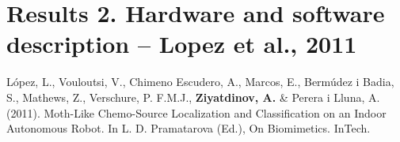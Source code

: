 
\thispagestyle{empty}

\begingroup
\let\clearpage\relax
\let\cleardoublepage\relax
\let\cleardoublepage\relax

\vspace*{3cm}

  {
    \section{Results 2. Hardware and software description  -- Lopez et al., 2011}\label{pub2}
  }

\medskip

\noindent L\'{o}pez, L., Vouloutsi, V., Chimeno Escudero, A., Marcos, E., Berm\'{u}dez i Badia, S., Mathews, Z., 
Verschure, P. F.M.J., \textbf{Ziyatdinov, A.} \& Perera i Lluna, A. (2011). 
Moth-Like Chemo-Source Localization and Classification on an Indoor Autonomous Robot. 
In L. D. Pramatarova (Ed.), On Biomimetics. InTech.
\cite{Lopez2011}

\endgroup			

\vfill
